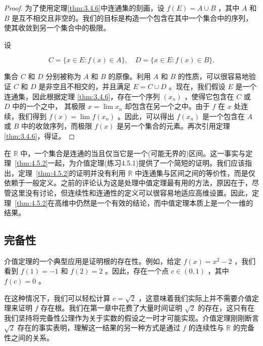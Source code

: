\begin{proof}
为了使用定理\ref{thm:3.4.6}中连通集的刻画，设 \(f\left( E\right)  = A \cup  B\) ，其中 \(A\) 和 \(B\) 是互不相交且非空的。我们的目标是构造一个包含在其中一个集合中的序列，使其收敛到另一个集合中的极限。

设

\[
C = \{ x \in  E : f\left( x\right)  \in  A\} , \quad D = \{ x \in  E : f\left( x\right)  \in  B\} .
\]

集合 \(C\) 和 \(D\) 分别被称为 \(A\) 和 \(B\) 的原像。利用 \(A\) 和 \(B\) 的性质，可以很容易地验证 \(C\) 和 \(D\) 是非空且不相交的，并且满足 \(E = C \cup  D\) 。现在，我们假设 \(E\) 是一个连通集，因此根据定理 \ref{thm:3.4.6}，存在一个序列 \(\left( {x}_{n}\right)\) ，使得它包含在 \(C\) 或 \(D\) 中的一个之中， 其极限 \(x = \lim {x}_{n}\) 却包含在另一个之中。由于 \(f\) 在 \(x\) 处连续，我们得到 \(f\left( x\right)  = \lim f\left( {x}_{n}\right)\) 。因此，可以得出 \(f\left( {x}_{n}\right)\) 是一个包含在 \(A\) 或 \(B\) 中的收敛序列，而极限 \(f\left( x\right)\) 是另一个集合的元素。再次引用定理 \ref{thm:3.4.6}，得证。
\end{proof}

在 \(\mathbb{R}\) 中，一个集合是连通的当且仅当它是一个(可能无界的)区间。这一事实与定理~\ref{thm:4.5.2}一起，为介值定理(练习4.5.1)提供了一个简短的证明。我们应该指出，定理~\ref{thm:4.5.2}的证明并没有利用 \(\mathbb{R}\) 中连通集与区间之间的等价性，而是仅依赖于一般定义。之前的评论认为这是处理中值定理最有用的方法，原因在于，尽管这里没有讨论，但连续性和连通性的定义可以很容易地适应高维设置。因此，定理~\ref{thm:4.5.2}在高维中仍然是一个有效的结论，而中值定理本质上是一个一维的结果。

\subsection{完备性}

介值定理的一个典型应用是证明根的存在性。例如，给定 \(f\left( x\right)  = {x}^{2} - 2\) ，我们看到 \(f\left( 1\right)  =  - 1\) 和 \(f\left( 2\right)  = 2\) 。因此，存在一个点 \(c \in  \left( {0,1}\right)\) ，其中 \(f\left( c\right)  = 0\) 。

在这种情况下，我们可以轻松计算 \(c = \sqrt{2}\) ，这意味着我们实际上并不需要介值定理来证明 \(f\) 存在根。我们在第一章中花费了大量时间证明 \(\sqrt{2}\) 的存在，这只有在我们坚持将完备性公理作为关于实数的假设之一时才可能实现。介值定理刚刚断言 \(\sqrt{2}\) 存在的事实表明，理解这一结果的另一种方式是通过 \(f\) 的连续性与 \(\mathbb{R}\) 的完备性之间的关系。

